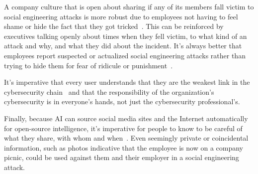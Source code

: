 A company culture that is open about sharing if any of its members fall victim to social engineering attacks is more robust due to employees not having to feel shame or hide the fact that they got tricked~\citep{hadnagy_Social_Engineering_The_Science_2018}. This can be reinforced by executives talking openly about times when they fell victim, to what kind of an attack and why, and what they did about the incident. It's always better that employees report suspected or actualized social engineering attacks rather than trying to hide them for fear of ridicule or punishment~\citep{mitnick_The_Art_of_Deception_2003}.

It's imperative that every user understands that they are the weakest link in the cybersecurity chain~\citep{mitnick_The_Art_of_Deception_2003} and that the responsibility of the organization's cybersecurity is in everyone's hands, not just the cybersecurity professional's.

Finally, because AI can source social media sites and the Internet automatically for open-source intelligence, it's imperative for people to know to be careful of what they share, with whom and when~\citep{mitnick_The_Art_of_Deception_2003}. Even seemingly private or coincidental information, such as photos indicative that the employee is now on a company picnic, could be used against them and their employer in a social engineering attack.